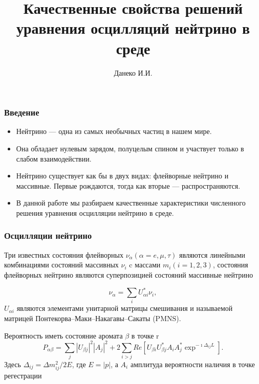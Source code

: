 \documentclass[utf8,9pt,mathserif,usepdftitle=false]{beamer}
\title{Качественные свойства решений уравнения осцилляций нейтрино в среде
}%
\author{Данеко И.И.}
\date[ИГУ, 2025]{%
  20 октября 2025\\%
  \vspace*{10ex}%
  \begin{flushright}
    \small
    Научный руководитель: Ломов В.П.\par
  \end{flushright}
  {\vspace*{7ex}
    \footnotesize%
    Иркутск, ФГБОУ ВО ИГУ\par%
  } }
\begin{document}
\begin{frame}
  \titlepage
\end{frame}

\begin{frame}
  \frametitle{Введение}%
  \begin{itemize}
  \item<1->
   Нейтрино — одна из самых необычных частиц в нашем мире.
   
   \item<2->
   Она обладает нулевым зарядом, полуцелым спином и участвует только в слабом
   взаимодействии.
  
  \item<3-> 
  Нейтрино существует как бы в двух видах: флейворные нейтрино и
  массивные. Первые рождаются, тогда как вторые — распространяются.
 
  
  \item<4->%
   В данной работе мы разбираем качественные
  характеристики численного решения уравнения осцилляции нейтрино в среде.
  \end{itemize}
\end{frame}

\begin{frame}
  \frametitle{Осцилляции нейтрино}%
  Три известных состояния флейворных  \({\nu_{\alpha}}(\alpha= e, \mu, \tau)\) являются линейными комбинациями состояний массивных \({\nu_{i}}\) c массами \(m_{i}(i=1,2,3)\), состояния флейворных нейтрино являются суперпозицией состояний массивные нейтрино
  
  \begin{equation*}\label{eq:1}
  	{\nu_{\alpha}}=\sum_{i}U_{\alpha i}^{*}{\nu_{i}},
  \end{equation*} 
  \(U_{\alpha i}\) являются элементами унитарной матрицы
  смешивания и называемой матрицей Понтекорва–Маки–Накагавы–Сакаты (PMNS).
  
  Вероятность иметь состояние аромата \(\beta\) в точке r
  \begin{equation*}
  	P_{\alpha\beta}=\sum_{j}|U_{\beta j}|^{2}|A_{j}|^{2}+2\sum_{i>j}Re[U_{\beta i}U_{\beta j}^{*}A_{i}A_{j}^{*}\exp^{-\imath\Delta_{ij}L}].
  \end{equation*}
  Здесь \(\Delta_{ij}=\Delta m_{ij}^2/2E\), где \(E=|p|\), а \(A_{i}\) амплитуда вероятности наличия в точке регестрации
\end{frame}
\end{document}
